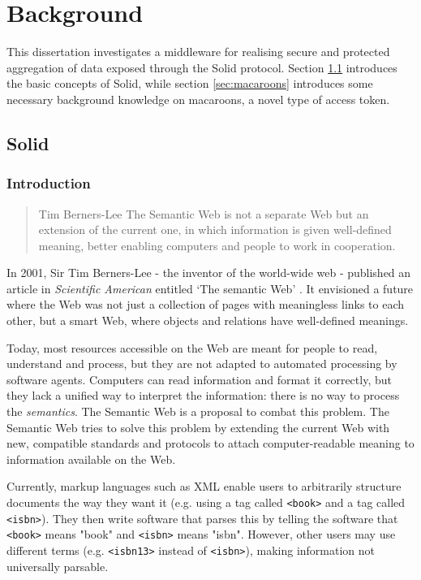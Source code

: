 \chapter{Background}
\label{cha:background}
This dissertation investigates a middleware for realising secure and protected aggregation of data exposed through the Solid protocol. Section \ref{sec:solid} introduces the basic concepts of Solid, while section \ref{sec:macaroons} introduces some necessary background knowledge on macaroons, a novel type of access token.

\section{Solid}
\label{sec:solid}

\subsection{Introduction}
\begin{quote}{Tim Berners-Lee}
    The Semantic Web is not a separate Web but an extension of the current one, in which information is given well-defined meaning, better enabling computers and people to work in cooperation.
\end{quote}

\noindent In 2001, Sir Tim Berners-Lee - the inventor of the world-wide web - published an article in \textit{Scientific American} entitled `The semantic Web' \citep{semantic-web}. It envisioned a future where the Web was not just a collection of pages with meaningless links to each other, but a smart Web, where objects and relations have well-defined meanings.

Today, most resources accessible on the Web are meant for people to read, understand and process, but they are not adapted to automated processing by software agents. Computers can read information and format it correctly, but they lack a unified way to interpret the information: there is no way to process the \textit{semantics}. The Semantic Web is a proposal to combat this problem. The Semantic Web tries to solve this problem by extending the current Web with new, compatible standards and protocols to attach computer-readable meaning to information available on the Web.

Currently, markup languages such as XML enable users to arbitrarily structure documents the way they want it (e.g. using a tag called \texttt{<book>} and a tag called \texttt{<isbn>}). They then write software that parses this by telling the software that \texttt{<book>} means "book" and \texttt{<isbn>} means "isbn". However, other users may use different terms (e.g. \texttt{<isbn13>} instead of \texttt{<isbn>}), making information not universally parsable. 


